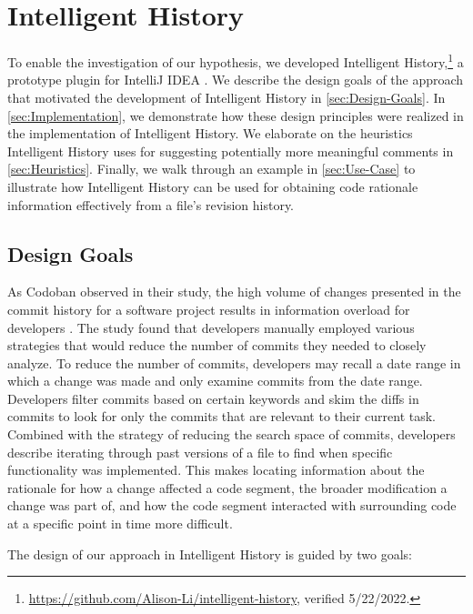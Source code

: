 \chapter{Intelligent History}
\label{ch:Intelligent-History}

To enable the investigation of our hypothesis, we developed Intelligent History,\footnote{\url{https://github.com/Alison-Li/intelligent-history}, verified 5/22/2022.} 
a prototype plugin for IntelliJ IDEA .
We describe the design goals of the approach that motivated the development of Intelligent History in \autoref{sec:Design-Goals}. 
In \autoref{sec:Implementation}, we demonstrate how these design principles were realized in the implementation of Intelligent History. 
We elaborate on the heuristics Intelligent History uses for suggesting potentially more meaningful comments in \autoref{sec:Heuristics}.
Finally, we walk through an example in \autoref{sec:Use-Case} to illustrate how Intelligent History can be used for obtaining code rationale information effectively from a file's revision history.

\section{Design Goals}
\label{sec:Design-Goals}

As Codoban \etal observed in their study, the high volume of changes presented in the commit history for a software project results in information overload for developers \cite{codoban_software_2015}.
The study found that developers manually employed various strategies that would reduce the number of commits they needed to closely analyze.
To reduce the number of commits, developers may recall a date range in which a change was made and only examine commits from the date range.
Developers filter commits based on certain keywords and skim the diffs in commits to look for only the commits that are relevant to their current task.
Combined with the strategy of reducing the search space of commits, developers describe iterating through past versions of a file to find when specific functionality was implemented.
This makes locating information about the rationale for how a change affected a code segment, 
the broader modification a change was part of, 
and how the code segment interacted with surrounding code at a specific point in time more difficult.

The design of our approach in Intelligent History is guided by two goals: 

